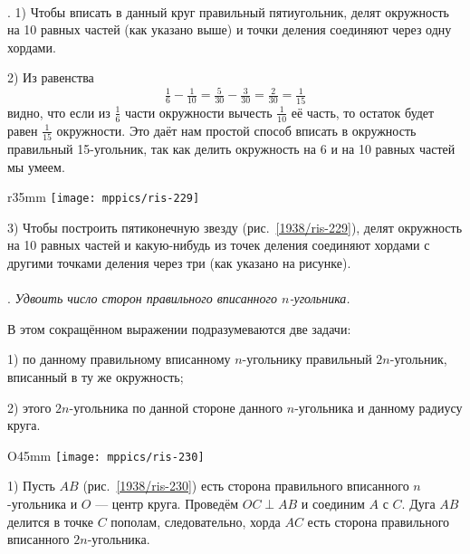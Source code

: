 {\small

\paragraph{}\label{1938/223}
\mbox{.}
1) Чтобы вписать в данный круг правильный пятиугольник, делят окружность на 10 равных частей (как указано выше) и точки деления соединяют через одну хордами.

2) Из равенства
\[\tfrac16-\tfrac1{10}=\tfrac5{30}-\tfrac3{30}=\tfrac2{30}=\tfrac1{15}\]
видно, что если из $\tfrac16$ части окружности вычесть $\tfrac1{10}$ её часть, то остаток будет равен $\tfrac1{15}$ окружности.
Это даёт нам простой способ вписать в окружность правильный 15-угольник, так как делить окружность на 6 и на 10 равных частей мы умеем.

\begin{wrapfigure}{r}{35mm}
\centering
\texttt{[image: mppics/ris-229]}
\caption{}\label{1938/ris-229}
\end{wrapfigure}

3) Чтобы построить пятиконечную звезду (рис.~\ref{1938/ris-229}), делят окружность на 10 равных частей и какую-нибудь из точек деления соединяют хордами с другими точками деления через три (как указано на рисунке).

\paragraph{}\label{1938/224}
\mbox{.}
\emph{Удвоить число сторон правильного вписанного $n$-угольника.}

В этом сокращённом выражении подразумеваются две задачи:

1) по данному правильному вписанному $n$-угольнику  правильный $2n$-угольник, вписанный в ту же окружность;

2)  этого $2n$-угольника по данной стороне данного $n$-угольника и данному радиусу круга.

\begin{wrapfigure}{O}{45mm}
\centering
\texttt{[image: mppics/ris-230]}
\caption{}\label{1938/ris-230}
\end{wrapfigure}

1) Пусть $AB$ (рис.~\ref{1938/ris-230}) есть сторона правильного вписанного $n$-угольника и $O$ — центр круга.
Проведём $OC\perp AB$ и соединим $A$ с $C$.
Дуга $AB$ делится в точке $C$ пополам, следовательно, хорда $AC$ есть сторона правильного вписанного $2n$-угольника.

}
